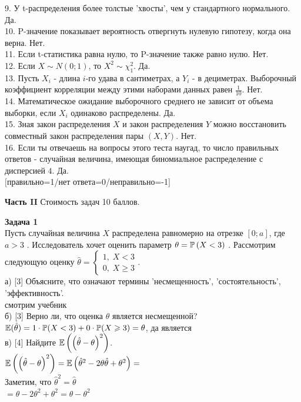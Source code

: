 \documentclass[12pt, a4paper]{article}\usepackage[]{graphicx}\usepackage[]{color}
\begin{document}
	9. У t-распределения более толстые 'хвосты', чем у стандартного
	нормального. Да.  \\

	10. P-значение показывает вероятность отвергнуть нулевую гипотезу,
	когда она верна. Нет. \\

	11. Если t-статистика равна нулю, то P-значение также равно нулю.
	Нет.
	\\

	12. Если $X\sim N(0;1)$, то $X^{2}\sim \chi_{1}^{2}$. Да.  \\

	13. Пусть $X_{i}$ - длина $i$-го удава в сантиметрах, а $Y_{i}$ -
	в дециметрах. Выборочный коэффициент корреляции между этими
	наборами данных равен $\frac{1}{10}$. Нет. \\

	14. Математическое ожидание выборочного среднего не зависит от
	объема выборки, если $X_{i}$ одинаково распределены. Да. \\

	15. Зная закон распределения $X$ и закон распределения $Y$
	можно восстановить совместный закон распределения пары $(X,Y)$. Нет. \\

	16. Если ты отвечаешь на вопросы этого теста наугад, то число
	правильных ответов - случайная величина, имеющая биномиальное
	распределение с дисперсией $4$. Да. \\
	$[$правильно=1/нет ответа=0/неправильно=-1$]$


	{\bf Часть II} Стоимость задач 10 баллов.

	{\bf Задача 1} \\
	Пусть случайная величина  $X$  распределена
	равномерно на отрезке $\left[0;a\right]$, где  $a>3$ .
	Исследователь хочет оценить параметр  $\theta =\P\left(X<3\right)$
	. Рассмотрим следующую оценку $\hat{\theta
	}=\left\{\begin{array}{l} {1,\; X<3} \\ {0,\; X\ge 3}
	\end{array}\right. $. \\
	а) [3] Объясните, что означают термины 'несмещенность',
	'состоятельность', 'эффективность'. \\
	смотрим учебник \\
	б) [3] Верно ли, что оценка $\hat{\theta}$ является несмещенной? \\
	$\E(\hat{\theta})=1\cdot \P(X<3)+0\cdot \P(X \ge 3)=\theta$, да
	является \\
	в) [4] Найдите $\E\left(\left(\hat{\theta }-\theta \right)^{2}
	\right)$. \\
	$\E\left(\left(\hat{\theta }-\theta \right)^{2} \right)=
	\E\left(\hat{\theta}^{2}-2\theta\hat{\theta}+\theta^{2}\right)=$ \\
	Заметим, что $\hat{\theta}^{2}=\hat{\theta}$ \\
	$=\theta-2\theta^{2}+\theta^{2}=\theta-\theta^{2}$ \\
\end{document}
